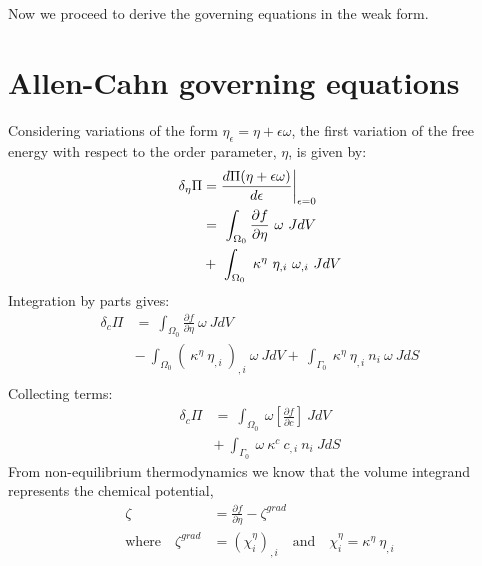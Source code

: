 \noindent Now we proceed to derive the governing equations in the weak form.

\section{Allen-Cahn governing equations}
Considering variations of the form $\eta_{\epsilon} = \eta + \epsilon \omega$, the first variation of the free energy with respect to the order parameter, $\eta$, is given by:
\begin{align}
\delta_{\eta}\Pi &= \frac{d \Pi(\eta + \epsilon \omega)}{d\epsilon} \bigg|_{\epsilon=0} \notag  \nonumber \\
  &= ~\int_{\Omega_0}  \frac{\partial f}{\partial \eta}~\omega ~J dV  \nonumber \\
  &+ ~\int_{\Omega_0}  ~\kappa^{\eta}~\eta_{,i}~\omega_{,i} ~J dV  
\end{align}
Integration by parts gives:
\begin{align}
\delta_{c}\Pi &= ~\int_{\Omega_0}  \frac{\partial f}{\partial \eta}~\omega ~J dV  \nonumber \\
  &- ~\int_{\Omega_0}  \left(~\kappa^{\eta}~\eta_{,i}~\right)_{,i} ~\omega ~J dV + ~\int_{\Gamma_0} ~\kappa^{\eta}~\eta_{,i} ~n_{i} ~\omega ~J dS  \nonumber \\
\end{align}
Collecting terms:
\begin{align}
\delta_{c}\Pi &= ~\int_{\Omega_0}  ~\omega \left[\frac{\partial f}{\partial c}  \right] ~J dV  \nonumber \\
  &+ ~\int_{\Gamma_0} ~\omega  ~\kappa^c~c_{,i}  ~n_{i} ~J dS
\end{align}
From non-equilibrium thermodynamics we know that the volume integrand represents the chemical potential, 
\begin{align}
\zeta &= \frac{\partial f}{\partial \eta} - \zeta^{grad}\\
\text{where} \quad \zeta^{grad} &= (\chi^\eta_i)_{,i} \quad \text{and} \quad \chi^\eta_i = \kappa^\eta~\eta_{,i}  \nonumber
\end{align}


